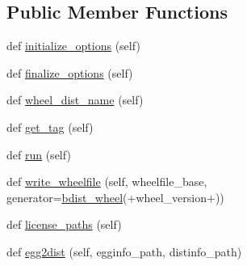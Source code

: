 \subsection*{Public Member Functions}
\begin{DoxyCompactItemize}
\item 
def \hyperlink{classwheel_1_1bdist__wheel_1_1bdist__wheel_ac2f0264d9e3c98181d9aa9e87e45676f}{initialize\+\_\+options} (self)
\item 
def \hyperlink{classwheel_1_1bdist__wheel_1_1bdist__wheel_a2bb5adc0329cc5f90cd146aeae8cae94}{finalize\+\_\+options} (self)
\item 
def \hyperlink{classwheel_1_1bdist__wheel_1_1bdist__wheel_aba10ae33d2d8a103dcf0873678e2ac89}{wheel\+\_\+dist\+\_\+name} (self)
\item 
def \hyperlink{classwheel_1_1bdist__wheel_1_1bdist__wheel_a17dbf4e1e246b2a13d1ca413b4517a79}{get\+\_\+tag} (self)
\item 
def \hyperlink{classwheel_1_1bdist__wheel_1_1bdist__wheel_a6fcbc2c28940276344c16945fa96daad}{run} (self)
\item 
def \hyperlink{classwheel_1_1bdist__wheel_1_1bdist__wheel_a9c34b4a4a9f70461e6feb9ca086e7b59}{write\+\_\+wheelfile} (self, wheelfile\+\_\+base, generator=\textquotesingle{}\hyperlink{classwheel_1_1bdist__wheel_1_1bdist__wheel}{bdist\+\_\+wheel}(\textquotesingle{}+wheel\+\_\+version+\textquotesingle{})\textquotesingle{})
\item 
def \hyperlink{classwheel_1_1bdist__wheel_1_1bdist__wheel_a2992ae1fb0fffb9dab293a2a687ee2b2}{license\+\_\+paths} (self)
\item 
def \hyperlink{classwheel_1_1bdist__wheel_1_1bdist__wheel_ad311a5eef9c0bddfa1dde103b7f8b06b}{egg2dist} (self, egginfo\+\_\+path, distinfo\+\_\+path)
\end{DoxyCompactItemize}
